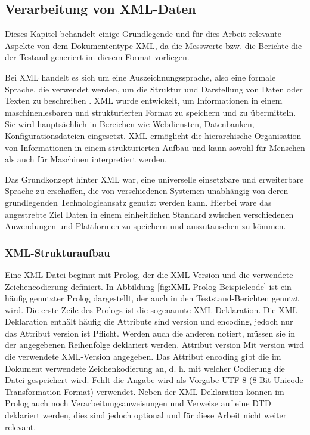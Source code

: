 \subsection{Verarbeitung von XML-Daten}
\label{subsec:verarbeitung-von-xml-daten}
Dieses Kapitel behandelt einige Grundlegende und für dies Arbeit relevante Aspekte von dem Dokumententype \ac{XML},
da die Messwerte bzw. die Berichte die der Testand generiert im diesem Format vorliegen.


Bei \ac{XML} handelt es sich um eine Auszeichnungssprache, also eine
formale Sprache, die verwendet werden, um die Struktur und Darstellung von Daten oder Texten zu beschreiben \cite*{Neumann2019}.
\ac{XML} wurde entwickelt, um Informationen in einem maschinenlesbaren und strukturierten Format zu speichern und zu übermitteln.
Sie wird hauptsächlich in Bereichen wie Webdiensten, Datenbanken, Konfigurationsdateien eingesetzt.
\ac{XML} ermöglicht die hierarchische Organisation von Informationen in einem strukturierten Aufbau und kann sowohl für Menschen
als auch für Maschinen interpretiert werden.\cite*[4]{PeterBrezany2003}

Das Grundkonzept hinter \ac{XML} war, eine universelle einsetzbare und erweiterbare Sprache zu erschaffen, die von verschiedenen Systemen
unabhängig von deren grundlegenden Technologieansatz genutzt werden kann.
Hierbei ware das angestrebte Ziel Daten in einem einheitlichen Standard zwischen verschiedenen Anwendungen und Plattformen zu speichern und auszutauschen
zu kömmen.\cite*[3-5]{PeterBrezany2003}
\subsubsection{XML-Strukturaufbau}
Eine \ac{XML}-Datei beginnt mit Prolog, der die \ac{XML}-Version und die verwendete Zeichencodierung definiert.
In Abbildung \ref{fig:XML Prolog Beispielcode} ist ein häufig genutzter Prolog dargestellt, der auch in den Teststand-Berichten genutzt wird.
Die erste Zeile des Prologs ist die sogenannte XML-Deklaration.
Die XML-Deklaration enthält häufig die Attribute sind version und encoding, jedoch nur das Attribut version ist Pflicht.
Werden auch die anderen notiert, müssen sie in der angegebenen Reihenfolge deklariert werden.
Attribut version Mit version wird die verwendete XML-Version angegeben.
Das Attribut encoding gibt die im Dokument verwendete Zeichenkodierung an, d. h. mit welcher Codierung die Datei gespeichert wird.
Fehlt die Angabe wird als Vorgabe UTF-8 (8-Bit Unicode Transformation Format) verwendet.
Neben der \ac{XML}-Deklaration können im Prolog auch noch Verarbeitungsanweisungen und Verweise auf eine \ac{DTD} deklariert werden,
dies sind jedoch optional und für diese Arbeit nicht weiter relevant.
\cite*[8,9]{Becher2022}

